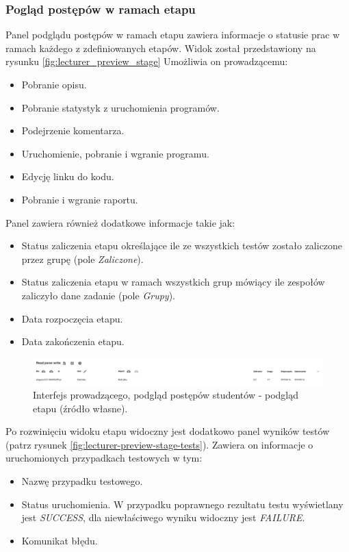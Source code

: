 \subsubsection{Pogląd postępów w ramach etapu}

Panel podglądu postępów w ramach etapu zawiera informacje o statusie prac w ramach każdego z zdefiniowanych etapów.
Widok został przedstawiony na rysunku \ref{fig:lecturer_preview_stage}
Umożliwia on prowadzącemu:
\begin {itemize}
    \item Pobranie opisu.
    \item Pobranie statystyk z uruchomienia programów.
    \item Podejrzenie komentarza.
    \item Uruchomienie, pobranie i wgranie programu.
    \item Edycję linku do kodu.
    \item Pobranie i wgranie raportu.
\end {itemize}

Panel zawiera również dodatkowe informacje takie jak:
\begin{itemize}
    \item Status zaliczenia etapu określające ile ze wszystkich testów zostało zaliczone przez grupę (pole \textit{Zaliczone}).
    \item Status zaliczenia etapu w ramach wszystkich grup mówiący ile zespołów zaliczyło dane zadanie (pole \textit{Grupy}).
    \item Data rozpoczęcia etapu.
    \item Data zakończenia etapu.
\end{itemize}

\begin{figure}[h]
    \centering
    \includegraphics[width = 13cm]{chapter04/lecturer_preview_stage.png}
    \caption{Interfejs prowadzącego, podgląd postępów studentów - podgląd etapu (źródło własne).}
    \label{fig:lecturer-preview-stage}
\end{figure}

Po rozwinięciu widoku etapu widoczny jest dodatkowo panel wyników testów (patrz rysunek \ref{fig:lecturer-preview-stage-tests}).
Zawiera on informacje o uruchomionych przypadkach testowych w tym:
\begin{itemize}
    \item Nazwę przypadku testowego.
    \item Status uruchomienia. W przypadku poprawnego rezultatu testu wyświetlany jest \textit{SUCCESS}, dla niewłaściwego wyniku widoczny jest \textit{FAILURE}.
    \item Komunikat błędu.
\end{itemize}

